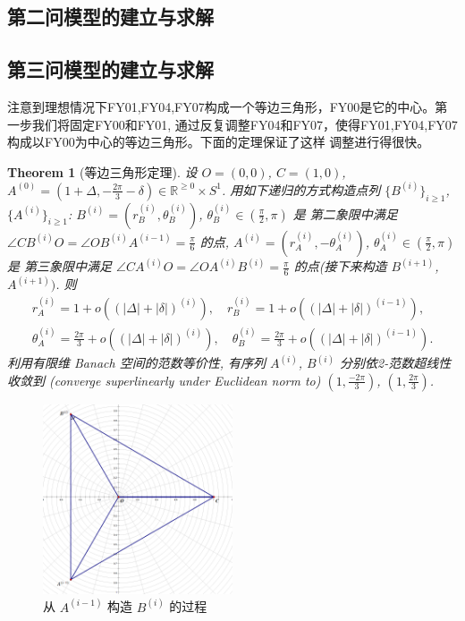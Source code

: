 \documentclass{my_paper}
\newcommand{\R}{\mathbb{R}}
\newtheorem{theorem}{Theorem}
\begin{document}
\subsection{第二问模型的建立与求解}

\subsection{第三问模型的建立与求解}
    注意到理想情况下FY01,FY04,FY07构成一个等边三角形，FY00是它的中心。第一步我们将固定FY00和FY01,
    通过反复调整FY04和FY07，使得FY01,FY04,FY07构成以FY00为中心的等边三角形。下面的定理保证了这样
    调整进行得很快。
\begin{theorem}[等边三角形定理]
\label{dbsjx} 
    设 $O=(0,0)$, $C=(1,0)$,   
    $A^{(0)}=(1+\Delta,-\frac{2\pi}3-\delta)\in \R^{\geq 0}\times S^1$. 用如下递归的方式构造点列
    $\{B^{(i)}\}_{i\geq 1}$, $\{A^{(i)}\}_{i\geq 1}$: 
    $B^{(i)}=(r_B^{(i)},\theta_B^{(i)})$, $\theta_{B}^{(i)}\in (\frac \pi 2,\pi)$ 是
    第二象限中满足 $\angle CB^{(i)}O=\angle OB^{(i)}A^{(i-1)}=\frac\pi6$ 的点, 
    $A^{(i)}=(r_A^{(i)},-\theta_A^{(i)})$, $\theta_{A}^{(i)}\in (\frac \pi 2,\pi)$ 是
    第三象限中满足 $\angle CA^{(i)}O=\angle OA^{(i)}B^{(i)}=\frac\pi6$ 的点(接下来构造 $B^{(i+1)}$, $A^{(i+1)})$. 
    则 
    \begin{equation}
    \begin{aligned}
        r_A^{(i)}=1+o((|\Delta|+|\delta|)^{(i)}),\quad r_B^{(i)}=1+o((|\Delta|+|\delta|)^{(i-1)}),
        \\
        \theta_A^{(i)}=\frac{2\pi}{3}+o((|\Delta|+|\delta|)^{(i)}),\quad \theta_B^{(i)}=\frac{2\pi}{3}+o((|\Delta|+|\delta|)^{(i-1)}).
    \end{aligned}
    \label{1}
    \end{equation}
    利用有限维 Banach 空间的范数等价性, 有序列 $A^{(i)}$, $B^{(i)}$ 分别依2-范数超线性收敛到
    (converge superlinearly under Euclidean norm to) $(1,\frac{-2\pi}3)$, $(1,\frac{2\pi}3)$.
\end{theorem} 

\begin{figure}[H]
    \centering
    \includegraphics[width=0.5\textwidth]{sketch1}
    \caption{从 $A^{(i-1)}$ 构造 $B^{(i)}$ 的过程} 
\end{figure}
\end{document}
